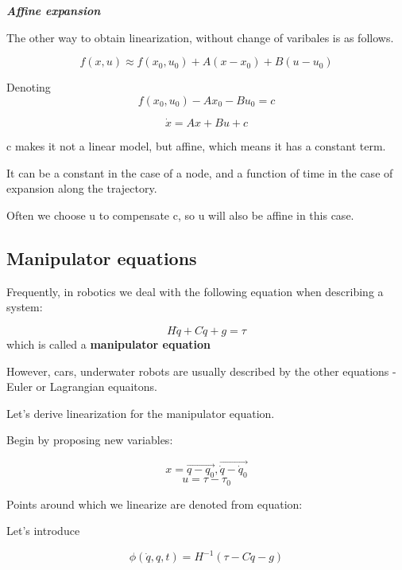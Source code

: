 \begin{center}
    \textbf{\textit{Affine expansion}}
\end{center}

The other way to obtain linearization, without change of varibales is as follows. 

\[f(x, u) \approx f(x_0, u_0) + A(x-x_0) + B(u-u_0) \]

Denoting \[f(x_0, u_0) - Ax_0 - Bu_0 = c\]

\[\dot x = Ax+ Bu+ c\]

c makes it not a linear model, but affine, which means it has a constant term.

It can be a constant in the case of a node, and a function of time in the case of expansion along the trajectory.


Often we choose u to compensate c, so u will also be affine in this case. 

\subsection{Manipulator equations}

Frequently, in robotics we deal with the following equation when describing a system:

\[H \ddot q + C \dot q  + g = \tau \] which is called a \textbf{manipulator equation}


However, cars, underwater robots are usually described by the other equations - Euler or Lagrangian equaitons. 

Let's derive linearization for the manipulator equation. 

Begin by proposing new variables: 

\[x = \vec{q - q_0}, \vec{\dot q - \dot q_0}\]
\[u = \tau - \tau_0\]

Points around which we linearize are denoted from equation:
\[\]




Let's introduce 

\[\phi(\dot q, q, t) = H^{-1} (\tau - C \dot q - g)\]










